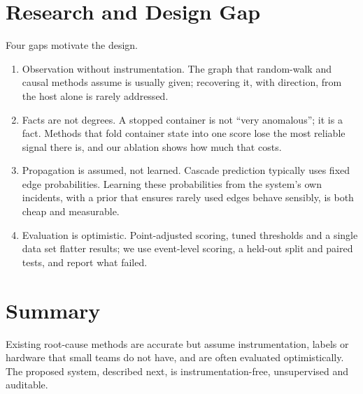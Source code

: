\section{Research and Design Gap}
Four gaps motivate the design.
\begin{enumerate}
\item Observation without instrumentation. The graph that random-walk and causal methods assume is usually given; recovering it, with direction, from the host alone is rarely addressed.
\item Facts are not degrees. A stopped container is not ``very anomalous''; it is a fact. Methods that fold container state into one score lose the most reliable signal there is, and our ablation shows how much that costs.
\item Propagation is assumed, not learned. Cascade prediction typically uses fixed edge probabilities. Learning these probabilities from the system's own incidents, with a prior that ensures rarely used edges behave sensibly, is both cheap and measurable.
\item Evaluation is optimistic. Point-adjusted scoring, tuned thresholds and a single data set flatter results; we use event-level scoring, a held-out split and paired tests, and report what failed.
\end{enumerate}

\section{Summary}
Existing root-cause methods are accurate but assume instrumentation, labels or hardware that small teams do not have, and are often evaluated optimistically. The proposed system, described next, is instrumentation-free, unsupervised and auditable.
